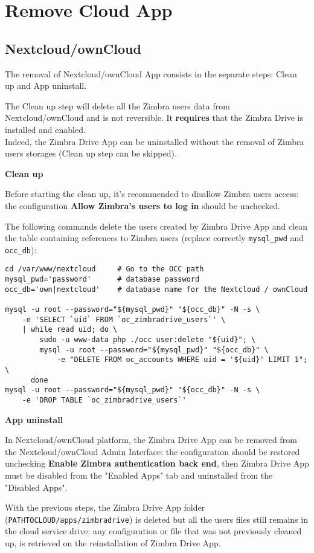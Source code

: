 \section{Remove Cloud App}
\subsection{Nextcloud/ownCloud}\label{subsec:NextcloudownCloudUninstallation}

    The removal of Nextcloud/ownCloud App consists in the separate steps: Clean up and App uninstall.

\begin{warning}
    The Clean up step will delete all the Zimbra users data from Nextcloud/ownCloud and is not reversible.
    It \textbf{requires} that the Zimbra Drive is installed and enabled.\\
    Indeed, the Zimbra Drive App can be uninstalled without the removal of Zimbra users storages
    (Clean up step can be skipped).
\end{warning}

    \textbf{Clean up}

\begin{info}
    Before starting the clean up, it's recommended to disallow Zimbra users access:
    the configuration \textbf{Allow Zimbra's users to log in} should be unchecked.
\end{info}
    The following commands delete the users created by Zimbra Drive App and clean the table containing
    references to Zimbra users (replace correctly \texttt{mysql\_pwd} and \texttt{occ\_db}):

\begin{verbatim}
cd /var/www/nextcloud     # Go to the OCC path
mysql_pwd='password'      # database password
occ_db='own|nextcloud'    # database name for the Nextcloud / ownCloud

mysql -u root --password="${mysql_pwd}" "${occ_db}" -N -s \
    -e 'SELECT `uid` FROM `oc_zimbradrive_users`' \
    | while read uid; do \
        sudo -u www-data php ./occ user:delete "${uid}"; \
        mysql -u root --password="${mysql_pwd}" "${occ_db}" \
            -e "DELETE FROM oc_accounts WHERE uid = '${uid}' LIMIT 1"; \
      done
mysql -u root --password="${mysql_pwd}" "${occ_db}" -N -s \
    -e 'DROP TABLE `oc_zimbradrive_users`'
\end{verbatim}

    \textbf{App uninstall}

    In Nextcloud/ownCloud platform, the Zimbra Drive App can be removed from the Nextcloud/ownCloud Admin Interface:
    the configuration should be restored unchecking \textbf{Enable Zimbra authentication back end},
    then Zimbra Drive App must be disabled from the "Enabled Apps" tab and uninstalled from the "Disabled Apps".

    With the previous steps, the Zimbra Drive App folder (\texttt{PATH\textunderscore TO\textunderscore CLOUD/apps/zimbradrive})
    is deleted but all the users files still remains in the cloud service drive:
    any configuration or file that was not previously cleaned up, is retrieved on the reinstallation of Zimbra Drive App.
